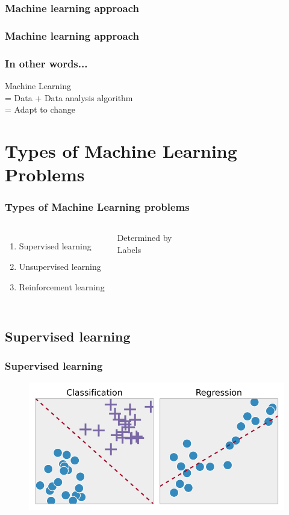 \documentclass[]{beamer}
\begin{document}
\subsubsection{Machine learning approach}

\begin{frame}
\frametitle{Machine learning approach}
\begin{center}
\end{center}
\end{frame}

\begin{frame}
\frametitle{In other words...}
\begin{center}
Machine Learning \\
 \huge = Data + Data analysis algorithm \\
 \Huge = Adapt to change
\end{center}
\end{frame}

\section{Types of Machine Learning Problems}

\begin{frame}
\frametitle{Types of Machine Learning problems}
\begin{columns}
\begin{enumerate}
\item<2-> Supervised learning
\item<3-> Unsupervised learning
\item<4-> Reinforcement learning
\end{enumerate}
\pause
{}
Determined by \\
\Huge Labels
\end{columns}
\end{frame}

\subsection{Supervised learning}

\begin{frame}
\frametitle{Supervised learning}
\begin{figure}
\includegraphics[scale=.35]{imgs/supervised_learning.png}
\end{figure}
\end{frame}
\end{document}
